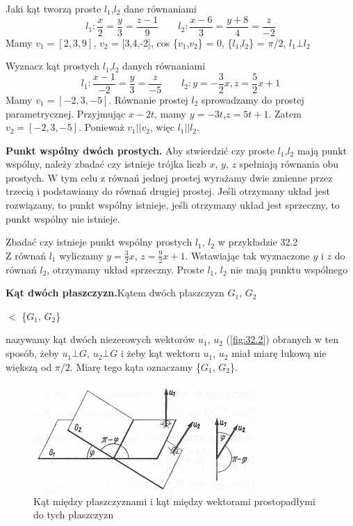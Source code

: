 \begin{przyklad}{32.2}
Jaki kąt tworzą proste $l_1$,$l_2$ dane równaniami
\begin{equation}
	l_1: \frac{x}{2} = \frac{y}{3} = \frac{z - 1}{9} \qquad l_2: \frac{x - 6}{3} = \frac{y +8}{4} = \frac{z}{-2} \nonumber
\end{equation}
Mamy $v_1 = [2,3,9]$, $v_2$ = [3,4,-2], cos \{$v_1$,$v_2$\} = 0, \{$l_1$,$l_2$\} = $\pi/2$, $l_1 \bot l_2$
\end{przyklad}

\begin{przyklad}{32.3}
Wyznacz kąt prostych $l_1$,$l_2$ danych równaniami
\begin{equation}
	l_1: \frac{x-1}{-2} = \frac{y}{3} = \frac{z}{-5} \qquad l_2: y = -\frac{3}{2}x, z = \frac{5}{2}x+1 \nonumber
\end{equation}
Mamy $v_1 = [-2,3,-5]$. Równanie prostej $l_2$ sprowadzamy do prostej parametrycznej. Przyjmując $x-2t$, mamy $y=-3t$,$z=5t+1$. Zatem $v_2=[-2,3,-5]$. Ponieważ $v_1||v_2$, więc $l_1||l_2$.
\end{przyklad}

\textbf{Punkt wspólny dwóch prostych.} Aby stwierdzić czy proste $l_1$,$l_2$ mają punkt wspólny, należy zbadać czy istnieje trójka liczb $x$, $y$, $z$ spełniają równania obu prostych. W tym celu z równań jednej prostej wyrażamy dwie zmienne przez trzecią i podstawiamy do równań drugiej prostej. Jeśli otrzymany układ jest rozwiązany, to punkt wspólny istnieje, jeśli otrzymany układ jest sprzeczny, to punkt wspólny nie istnieje.

\begin{przyklad}{32.4}
Zbadać czy istnieje punkt wspólny prostych $l_1$, $l_2$ w przykładzie 32.2 \\
Z równań $l_1$ wyliczamy $y=\frac{3}{2}x$, $z=\frac{9}{2}x+1$. Wstawiając tak wyznaczone $y$ i $z$ do równań $l_2$, otrzymamy układ sprzeczny. Proste $l_1$, $l_2$ nie mają punktu wspólnego
\end{przyklad}
\textbf{Kąt dwóch płaszczyzn.}Kątem dwóch płaszczyzn $G_1$, $G_2$
\begin{center}
$<$ \{$G_1$, $G_2$\}
\end{center}
nazywamy kąt dwóch niezerowych wektorów $u_1$, $u_2$ (\ref{fig:32.2}) obranych w ten sposób, żeby $u_1 \bot G$, $u_2 \bot G$ i żeby kąt wektoru $u_1$, $u_2$ miał miarę łukową nie większą od $\pi/2$. Miarę tego kąta oznaczamy \{$G_1$, $G_2$\}.

\begin{figure}[ht]
	\centering
		\includegraphics{rys/32_2.png}
	\caption{Kąt między płaszczyznami i kąt między wektorami prostopadłymi do tych płaszczyzn}
	\label{fig:31.3}
\end{figure}


